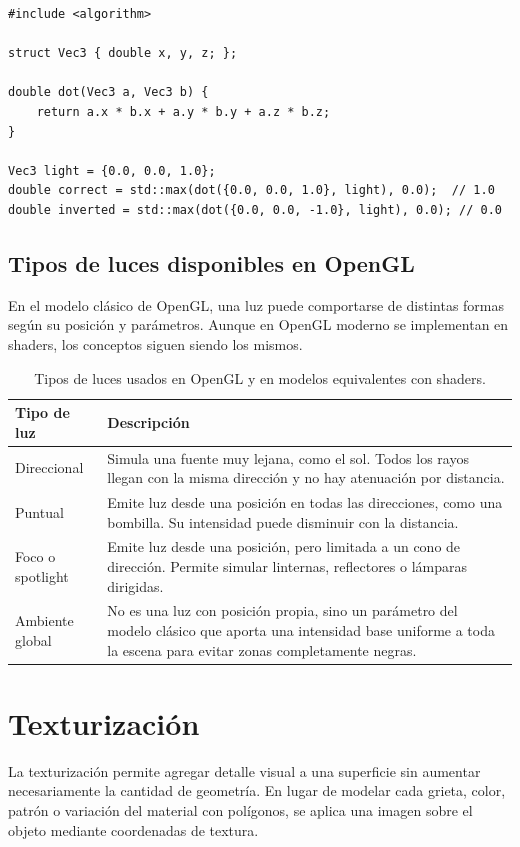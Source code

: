 \documentclass[a4paper,12pt]{article}
\begin{document}
\begin{lstlisting}
#include <algorithm>

struct Vec3 { double x, y, z; };

double dot(Vec3 a, Vec3 b) {
    return a.x * b.x + a.y * b.y + a.z * b.z;
}

Vec3 light = {0.0, 0.0, 1.0};
double correct = std::max(dot({0.0, 0.0, 1.0}, light), 0.0);  // 1.0
double inverted = std::max(dot({0.0, 0.0, -1.0}, light), 0.0); // 0.0
\end{lstlisting}

\subsection{Tipos de luces disponibles en OpenGL}

En el modelo clásico de OpenGL, una luz puede comportarse de distintas formas según su posición y parámetros. Aunque en OpenGL moderno se implementan en shaders, los conceptos siguen siendo los mismos.

\begin{table}[H]
\centering
\begin{tabular}{|p{}|p{}|}
\hline
\textbf{Tipo de luz} & \textbf{Descripción} \\
\hline
Direccional & Simula una fuente muy lejana, como el sol. Todos los rayos llegan con la misma dirección y no hay atenuación por distancia. \\
\hline
Puntual & Emite luz desde una posición en todas las direcciones, como una bombilla. Su intensidad puede disminuir con la distancia. \\
\hline
Foco o spotlight & Emite luz desde una posición, pero limitada a un cono de dirección. Permite simular linternas, reflectores o lámparas dirigidas. \\
\hline
Ambiente global & No es una luz con posición propia, sino un parámetro del modelo clásico que aporta una intensidad base uniforme a toda la escena para evitar zonas completamente negras. \\
\hline
\end{tabular}
\caption{Tipos de luces usados en OpenGL y en modelos equivalentes con shaders.}
\end{table}

\section{Texturización}

La texturización permite agregar detalle visual a una superficie sin aumentar necesariamente la cantidad de geometría. En lugar de modelar cada grieta, color, patrón o variación del material con polígonos, se aplica una imagen sobre el objeto mediante coordenadas de textura.
\end{document}
